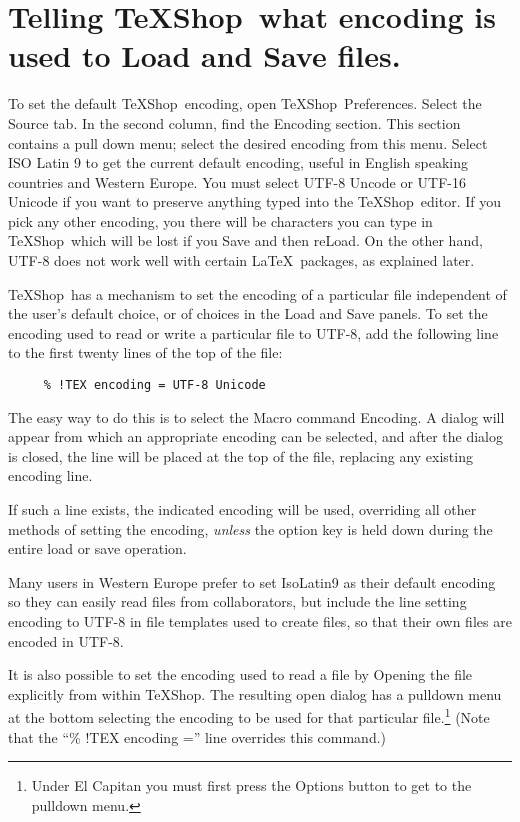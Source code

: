 \documentclass[letterpaper,11pt]{article}
\newcommand{\TS}{\textsf{\TeX Shop}}
\newcommand{\acr}[1]{\textsf{#1}}
\newcommand{\cmd}[1]{\textsf{#1}}
\begin{document}
\section{Telling \TS\ what encoding is used to Load and Save files.}

To set the default \TS\ encoding, open \TS\ Preferences. Select the Source tab.
In the second column, find the Encoding section. This section contains a pull down menu;
select the desired encoding from this menu. Select \acr{ISO Latin 9} to get the current default encoding, useful in English speaking countries and Western Europe. You must select
\acr{UTF-8 Uncode} or \acr{UTF-16 Unicode} if you want to preserve anything typed into the \TS\ editor. If you pick any other encoding, you there will be characters you can type in \TS\
which will be lost if you Save and then reLoad.
On the other hand, \acr{UTF-8} does not work well with certain \LaTeX\ packages, as explained later.

\TS\ has a mechanism to set the encoding of a particular file independent of the user's default choice, or of choices in the Load and Save panels. To set the encoding used to read or write a particular file to \acr{UTF-8}, add the following line to the first twenty lines of the top of the file:
\begin{verbatim}
     % !TEX encoding = UTF-8 Unicode
\end{verbatim}
The easy way to do this is to select the Macro command \cmd{Encoding}. A dialog will appear from which an appropriate encoding can be selected, and after the dialog is closed, the line will be placed at the top of the file, replacing any existing encoding line.

If such a line exists, the indicated encoding will be used, overriding all other methods
of setting the encoding, \emph{unless} the option key is held down during the entire
load or save operation. 

Many users in Western Europe prefer to set \acr{IsoLatin9} as their default encoding so they
can easily read files from collaborators, but include the line setting encoding to \acr{UTF-8}
in file templates used to create files, so that their own files are encoded in \acr{UTF-8}.

It is also possible to set the encoding used to read a file by Opening the file explicitly from within \TS. The resulting open dialog has a pulldown menu at the bottom selecting
the encoding to be used for that particular file.\footnote{Under \cmd{El Capitan} you must first press the \cmd{Options} button to get to the pulldown menu.} (Note that the ``\% !TEX encoding =''
line overrides this command.)
\end{document}
